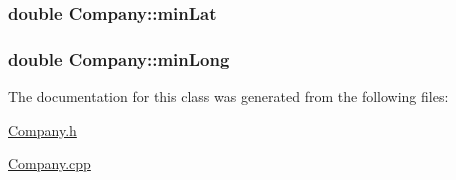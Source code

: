 \subsubsection[{min\+Lat}]{\setlength{\rightskip}{0pt plus 5cm}double Company\+::min\+Lat\hspace{0.3cm}{\ttfamily [protected]}}\label{class_company_a2284da8a5649f448ecef4e108981095d}
\hypertarget{class_company_aee15fab58f5a645e3f088c5ef886d7b6}{}
\subsubsection[{min\+Long}]{\setlength{\rightskip}{0pt plus 5cm}double Company\+::min\+Long\hspace{0.3cm}{\ttfamily [protected]}}\label{class_company_aee15fab58f5a645e3f088c5ef886d7b6}


The documentation for this class was generated from the following files\+:\begin{DoxyCompactItemize}
\item 
\hyperlink{_company_8h}{Company.\+h}\item 
\hyperlink{_company_8cpp}{Company.\+cpp}\end{DoxyCompactItemize}
